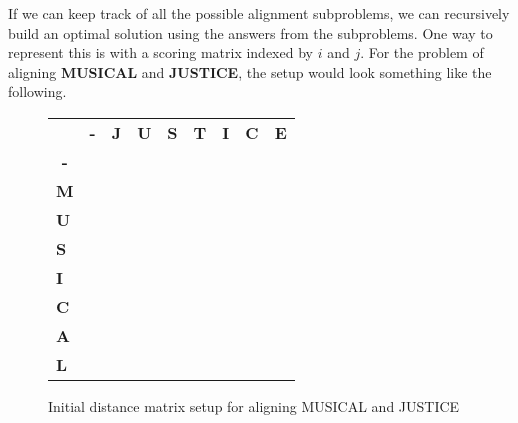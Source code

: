 If we can keep track of all the possible alignment subproblems, we can recursively build an optimal solution using the answers from the subproblems. One way to represent this is with a scoring matrix indexed by $i$ and $j$. For the problem of aligning \textbf{MUSICAL} and \textbf{JUSTICE}, the setup would look something like the following.


\begin{figure}[!h]
\centering
\begin{tabular}{lllllllll}
                                & \multicolumn{1}{c}{\textbf{-}} & \textbf{J}            & \textbf{U}            & \textbf{S}            & \textbf{T}            & \textbf{I}            & \textbf{C}            & \textbf{E}            \\ \cline{2-9} 
\multicolumn{1}{c|}{\textbf{-}} & \multicolumn{1}{l|}{}          & \multicolumn{1}{l|}{} & \multicolumn{1}{l|}{} & \multicolumn{1}{l|}{} & \multicolumn{1}{l|}{} & \multicolumn{1}{l|}{} & \multicolumn{1}{l|}{} & \multicolumn{1}{l|}{} \\ \cline{2-9} 
\multicolumn{1}{l|}{\textbf{M}} & \multicolumn{1}{l|}{}          & \multicolumn{1}{l|}{} & \multicolumn{1}{l|}{} & \multicolumn{1}{l|}{} & \multicolumn{1}{l|}{} & \multicolumn{1}{l|}{} & \multicolumn{1}{l|}{} & \multicolumn{1}{l|}{} \\ \cline{2-9} 
\multicolumn{1}{l|}{\textbf{U}} & \multicolumn{1}{l|}{}          & \multicolumn{1}{l|}{} & \multicolumn{1}{l|}{} & \multicolumn{1}{l|}{} & \multicolumn{1}{l|}{} & \multicolumn{1}{l|}{} & \multicolumn{1}{l|}{} & \multicolumn{1}{l|}{} \\ \cline{2-9} 
\multicolumn{1}{l|}{\textbf{S}} & \multicolumn{1}{l|}{}          & \multicolumn{1}{l|}{} & \multicolumn{1}{l|}{} & \multicolumn{1}{l|}{} & \multicolumn{1}{l|}{} & \multicolumn{1}{l|}{} & \multicolumn{1}{l|}{} & \multicolumn{1}{l|}{} \\ \cline{2-9} 
\multicolumn{1}{l|}{\textbf{I}} & \multicolumn{1}{l|}{}          & \multicolumn{1}{l|}{} & \multicolumn{1}{l|}{} & \multicolumn{1}{l|}{} & \multicolumn{1}{l|}{} & \multicolumn{1}{l|}{} & \multicolumn{1}{l|}{} & \multicolumn{1}{l|}{} \\ \cline{2-9} 
\multicolumn{1}{l|}{\textbf{C}} & \multicolumn{1}{l|}{}          & \multicolumn{1}{l|}{} & \multicolumn{1}{l|}{} & \multicolumn{1}{l|}{} & \multicolumn{1}{l|}{} & \multicolumn{1}{l|}{} & \multicolumn{1}{l|}{} & \multicolumn{1}{l|}{} \\ \cline{2-9} 
\multicolumn{1}{l|}{\textbf{A}} & \multicolumn{1}{l|}{}          & \multicolumn{1}{l|}{} & \multicolumn{1}{l|}{} & \multicolumn{1}{l|}{} & \multicolumn{1}{l|}{} & \multicolumn{1}{l|}{} & \multicolumn{1}{l|}{} & \multicolumn{1}{l|}{} \\ \cline{2-9} 
\multicolumn{1}{l|}{\textbf{L}}   & \multicolumn{1}{l|}{}          & \multicolumn{1}{l|}{} & \multicolumn{1}{l|}{} & \multicolumn{1}{l|}{} & \multicolumn{1}{l|}{} & \multicolumn{1}{l|}{} & \multicolumn{1}{l|}{} & \multicolumn{1}{l|}{} \\ \cline{2-9} 
\end{tabular}
\caption{Initial distance matrix setup for aligning MUSICAL and JUSTICE}
\label{alignsetup}
\end{figure}

